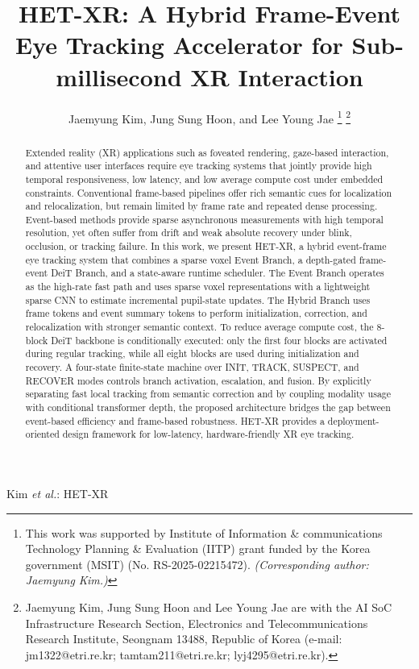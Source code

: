 \documentclass[journal]{IEEEtran}
\begin{document}

\title{HET-XR: A Hybrid Frame-Event Eye Tracking Accelerator for Sub-millisecond XR Interaction}
\author{Jaemyung Kim, Jung Sung Hoon, and Lee Young Jae%
\thanks{This work was supported by Institute of Information \& communications Technology Planning \& Evaluation (IITP) grant funded by the Korea government (MSIT) (No. RS-2025-02215472). \textit{(Corresponding author: Jaemyung Kim.)}}
\thanks{Jaemyung Kim, Jung Sung Hoon and Lee Young Jae are with the AI SoC Infrastructure Research Section, Electronics and Telecommunications Research Institute, Seongnam 13488, Republic of Korea (e-mail: jm1322@etri.re.kr; tamtam211@etri.re.kr; lyj4295@etri.re.kr).}%
}
%
{Kim \MakeLowercase{\textit{et al.}}: HET-XR}
\maketitle
\begin{abstract}
Extended reality (XR) applications such as foveated rendering, gaze-based interaction, and attentive user interfaces require eye tracking systems that jointly provide high temporal responsiveness, low latency, and low average compute cost under embedded constraints. Conventional frame-based pipelines offer rich semantic cues for localization and relocalization, but remain limited by frame rate and repeated dense processing. Event-based methods provide sparse asynchronous measurements with high temporal resolution, yet often suffer from drift and weak absolute recovery under blink, occlusion, or tracking failure. In this work, we present HET-XR, a hybrid event-frame eye tracking system that combines a sparse voxel Event Branch, a depth-gated frame-event DeiT Branch, and a state-aware runtime scheduler. The Event Branch operates as the high-rate fast path and uses sparse voxel representations with a lightweight sparse CNN to estimate incremental pupil-state updates. The Hybrid Branch uses frame tokens and event summary tokens to perform initialization, correction, and relocalization with stronger semantic context. To reduce average compute cost, the 8-block DeiT backbone is conditionally executed: only the first four blocks are activated during regular tracking, while all eight blocks are used during initialization and recovery. A four-state finite-state machine over INIT, TRACK, SUSPECT, and RECOVER modes controls branch activation, escalation, and fusion. By explicitly separating fast local tracking from semantic correction and by coupling modality usage with conditional transformer depth, the proposed architecture bridges the gap between event-based efficiency and frame-based robustness. HET-XR provides a deployment-oriented design framework for low-latency, hardware-friendly XR eye tracking.
\end{abstract}
\end{document}

